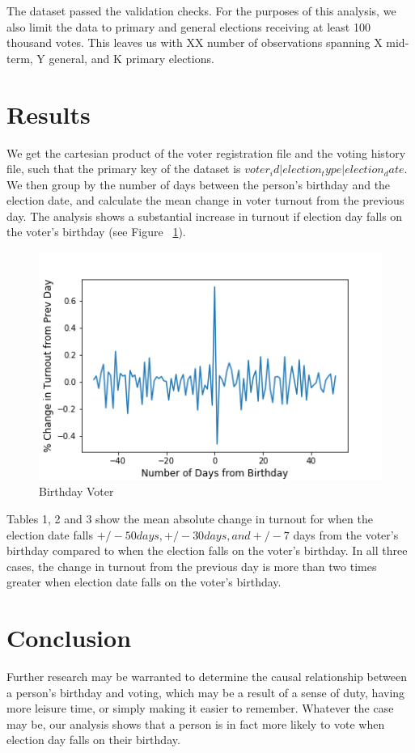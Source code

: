 \documentclass[12pt, letterpaper]{article}
\begin{document}
The dataset passed the validation checks. For the purposes of this analysis, we also limit the data to primary and general elections receiving at least 100 thousand votes. This leaves us with XX number of observations spanning X mid-term, Y general, and K primary elections. 



\section{Results}
We get the cartesian product of the voter registration file and the voting history file, such that the primary key of the dataset is $voter_id | election_type | election_date$. We then group by the number of days between the person's birthday and the election date, and calculate the mean change in voter turnout from the previous day. The analysis shows a substantial increase in turnout if election day falls on the voter's birthday (see Figure ~\ref{fig:birthday}).

\begin{figure}[H]
\centering
 \includegraphics[scale=.7]{../figs/fig1_turnout_chg_from_prev_day.png}
 \caption{Birthday Voter}
 \label{fig:birthday}
\end{figure}

Tables 1, 2 and 3 show the mean absolute change in turnout for when the election date falls $+/- 50 days,+/-  30 days, and +/- 7$ days from the voter's birthday compared to when the election falls on the voter's birthday. In all three cases, the change in turnout from the previous day is more than two times greater when election date falls on the voter’s birthday.

\section{Conclusion}
Further research may be warranted to determine the causal relationship between a person's birthday and voting, which may be a result of a sense of duty, having more leisure time, or simply making it easier to remember. Whatever the case may be, our analysis shows that a person is in fact more likely to vote when election day falls on their birthday. 
\end{document}
